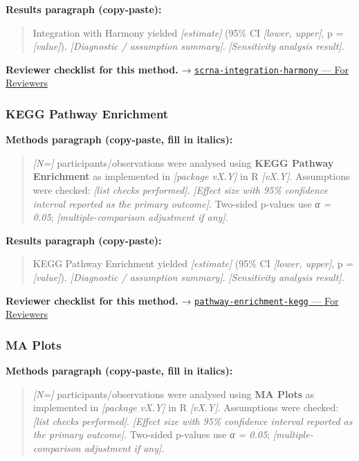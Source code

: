 \documentclass[
]{article}
\begin{document}
\textbf{Results paragraph (copy-paste):}

\begin{quote}
Integration with Harmony yielded \emph{{[}estimate{]}} (95\% CI
\emph{{[}lower, upper{]}}, p = \emph{{[}value{]}}). \emph{{[}Diagnostic
/ assumption summary{]}}. \emph{{[}Sensitivity analysis result{]}}.
\end{quote}

\textbf{Reviewer checklist for this method.} →
\href{../chapters/12-bioinformatics/scrna-integration-harmony.Rmd\#for-reviewers}{\texttt{scrna-integration-harmony}
--- For Reviewers}

\subsubsection{KEGG Pathway Enrichment}\label{kegg-pathway-enrichment}

\textbf{Methods paragraph (copy-paste, fill in italics):}

\begin{quote}
\emph{{[}N={]}} participants/observations were analysed using
\textbf{KEGG Pathway Enrichment} as implemented in \emph{{[}package
vX.Y{]}} in R \emph{{[}vX.Y{]}}. Assumptions were checked: \emph{{[}list
checks performed{]}}. \emph{{[}Effect size with 95\% confidence interval
reported as the primary outcome{]}}. Two-sided p-values use \emph{α =
0.05}; \emph{{[}multiple-comparison adjustment if any{]}}.
\end{quote}

\textbf{Results paragraph (copy-paste):}

\begin{quote}
KEGG Pathway Enrichment yielded \emph{{[}estimate{]}} (95\% CI
\emph{{[}lower, upper{]}}, p = \emph{{[}value{]}}). \emph{{[}Diagnostic
/ assumption summary{]}}. \emph{{[}Sensitivity analysis result{]}}.
\end{quote}

\textbf{Reviewer checklist for this method.} →
\href{../chapters/12-bioinformatics/pathway-enrichment-kegg.Rmd\#for-reviewers}{\texttt{pathway-enrichment-kegg}
--- For Reviewers}

\subsubsection{MA Plots}\label{ma-plots}

\textbf{Methods paragraph (copy-paste, fill in italics):}

\begin{quote}
\emph{{[}N={]}} participants/observations were analysed using \textbf{MA
Plots} as implemented in \emph{{[}package vX.Y{]}} in R
\emph{{[}vX.Y{]}}. Assumptions were checked: \emph{{[}list checks
performed{]}}. \emph{{[}Effect size with 95\% confidence interval
reported as the primary outcome{]}}. Two-sided p-values use \emph{α =
0.05}; \emph{{[}multiple-comparison adjustment if any{]}}.
\end{quote}
\end{document}
